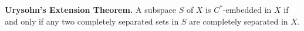 \textbf{Urysohn's Extension Theorem.} A subspace $S$ of $X$ is $C^*$-embedded in $X$ if and only if any two completely separated sets in $S$ are completely separated in $X$.
